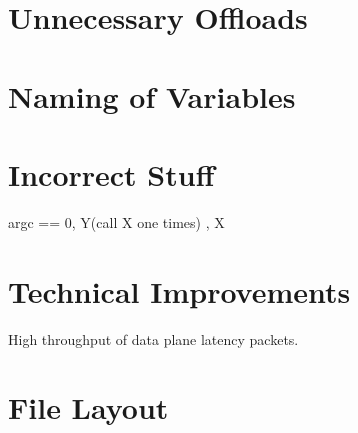 \section{Unnecessary Offloads}
\section{Naming of Variables}
\section{Incorrect Stuff} argc == 0, Y(call X one times) , X 
\section{Technical Improvements}
High throughput of data plane latency packets.
\section{File Layout}

